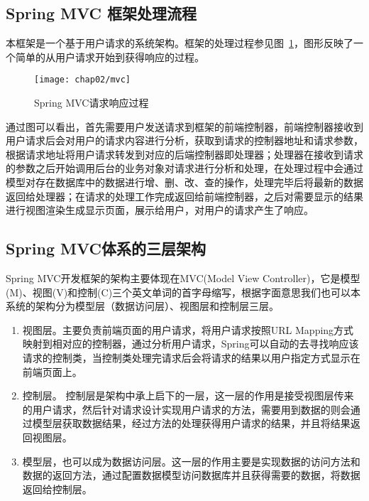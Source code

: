 \subsection{Spring MVC 框架处理流程}

本框架是一个基于用户请求的系统架构。框架的处理过程参见图~\ref{fig:mvc}，图形反映了一个简单的从用户请求开始到获得响应的过程。

\begin{figure}[H] %
  \centering
  \texttt{[image: chap02/mvc]}
  \caption{Spring MVC请求响应过程}
  \label{fig:mvc}
\end{figure}

通过图可以看出，首先需要用户发送请求到框架的前端控制器，前端控制器接收到用户请求后会对用户的请求内容进行分析，获取到请求的控制器地址和请求参数，根据请求地址将用户请求转发到对应的后端控制器即处理器；处理器在接收到请求的参数之后开始调用后台的业务对象对请求进行分析和处理，在处理过程中会通过模型对存在数据库中的数据进行增、删、改、查的操作，处理完毕后将最新的数据返回给处理器；在请求的处理工作完成返回给前端控制器，之后对需要显示的结果进行视图渲染生成显示页面，展示给用户，对用户的请求产生了响应\cite{李守振2006web}。

\subsection{Spring MVC体系的三层架构}
Spring MVC开发框架的架构主要体现在MVC(Model View Controller)，它是模型(M)、视图(V)和控制(C)三个英文单词的首字母缩写，根据字面意思我们也可以本系统的架构分为模型层（数据访问层）、视图层和控制层三层。

\begin{enumerate}

\item 视图层。主要负责前端页面的用户请求，将用户请求按照URL Mapping方式映射到相对应的控制器，通过分析用户请求，Spring可以自动的去寻找响应该请求的控制类，当控制类处理完请求后会将请求的结果以用户指定方式显示在前端页面上。

\item 控制层。 控制层是架构中承上启下的一层，这一层的作用是接受视图层传来的用户请求，然后针对请求设计实现用户请求的方法，需要用到数据的则会通过模型层获取数据结果，经过方法的处理获得用户请求的结果，并且将结果返回视图层。

\item 模型层，也可以成为数据访问层。这一层的作用主要是实现数据的访问方法和数据的返回方法，通过配置数据模型访问数据库并且获得需要的数据，将数据返回给控制层。

\end{enumerate}

